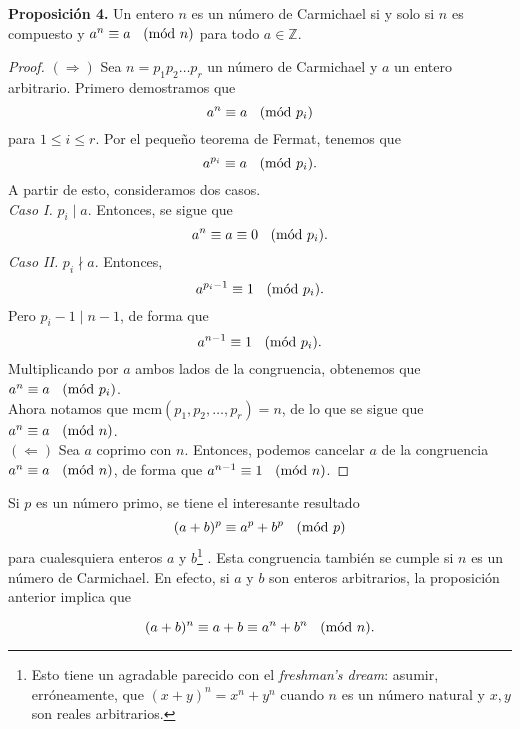 \documentclass{article}
\theoremstyle{definition}
\newcommand{\Mod}[1]{\ \hspace{0.2cm} (\mathrm{m\acute{o}d}\ #1)}
\begin{document}
\begin{mybox2}
	\textbf{Proposición 4. } Un entero $n$ es un número de Carmichael si y solo si $n$ es compuesto y $a^n \equiv a \Mod{n}$ para todo $a \in \mathbb{Z}$.
\end{mybox2}	
\begin{proof}
	$(\Rightarrow)$ Sea $n = p_{1} p_{2} \ldots p_{r}$ un número de Carmichael y $a$ un entero arbitrario. Primero demostramos que
	$$ a^{n} \equiv a \Mod{p_{i}} $$
	para $1 \leq i \leq r.$ Por el pequeño teorema de Fermat, tenemos que 
	$$ a^{p_{i}} \equiv a \Mod{p_{i}} .$$ 
	A partir de esto, consideramos dos casos. \\
	
	\textit{Caso I. } $p_{i} \mid a$. Entonces, se sigue que
	$$ a^{n} \equiv a \equiv 0 \Mod{p_{i}} .$$
	\textit{Caso II. } $p_{i} \nmid a .$ Entonces, 
	$$ a^{p_{i} - 1} \equiv 1 \Mod{p_{i}}. $$
	Pero $p_{i} - 1 \mid n - 1$, de forma que
	$$ a^{n - 1} \equiv 1 \Mod{p_{i}}. $$
	Multiplicando por $a$ ambos lados de la congruencia, obtenemos que $a^{n} \equiv a \Mod{p_{i}}$.  \\
	
	Ahora notamos que $\text{mcm}(p_{1}, p_{2}, \ldots , p_{r}) = n$, de lo que se sigue que $a^{n} \equiv a \Mod{n}$. \\
	
	$(\Leftarrow)$ Sea $a$ coprimo con $n$. Entonces, podemos cancelar $a$ de la congruencia $a^{n} \equiv a \Mod{n}$, de forma que $ a^{n-1} \equiv 1 \Mod{n}$.
\end{proof}
\vspace{0.5cm}
Si $p$ es un número primo, se tiene el interesante resultado
$$ (a + b)^{p} \equiv a^{p} + b^{p} \Mod{p} $$
para cualesquiera enteros $a$ y $b$\footnote{Esto tiene un agradable parecido con el \textit{freshman's dream}: asumir, erróneamente, que  $  (x + y)^{n} = x^n + y^n$ cuando $n$ es un número natural  y $x, y$ son reales arbitrarios. } .  Esta congruencia también se cumple  si $n$ es un número de Carmichael. En efecto, si $a$ y $b$ son enteros arbitrarios, la proposición anterior implica que

$$ (a + b)^{n} \equiv a + b \equiv a^{n} + b^{n} \Mod{n}.$$

\newpage
\end{document}
